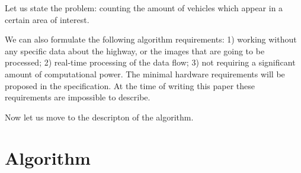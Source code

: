 \documentclass[12pt,a4paper,oneside,titlepage]{article}
\begin{document}
 



Let us state the problem: counting the amount of vehicles which appear in a certain area of interest.

We can also formulate the following algorithm requirements:
1) working without any specific data about the highway, or the images that are going to be processed;
2) real-time processing of the data flow;
3) not requiring a significant amount of computational power. The minimal hardware requirements will be proposed in the specification. At the time of writing this paper these requirements are impossible to describe.

Now let us move to the descripton of the algorithm.

































\newpage
\section{Algorithm}
\end{document}
